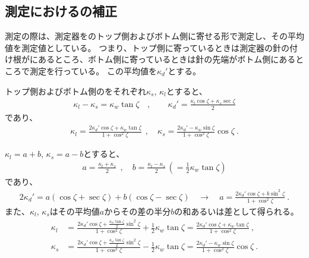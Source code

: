 \clearpage
\subsection{測定における\KeywayDepth の補正}%
測定の際は、測定器を\Keyway のトップ側およびボトム側に寄せる形で測定し、その平均値を測定値としている。
つまり、トップ側に寄っているときは測定器の針の付け根が\KeywayPos にあるところ、ボトム側に寄っているときは針の先端が\KeywayWidth ボトム側にあるところで測定を行っている。
この平均値を$\kappa_d'$とする。

トップ側およびボトム側の\AsideKeywayDepth をそれぞれ$\kappa_s$, $\kappa_l$とすると、
\begin{align*}
  \kappa_l-\kappa_s = \kappa_w\tan\zeta \quad,\qquad
  \kappa_d' = \frac{\kappa_l\cos\zeta+\kappa_s\sec\zeta}2
\end{align*}
であり、
\begin{align*}
  \kappa_l = \frac{2\kappa_d'\cos\zeta+\kappa_w\tan\zeta}{1+\cos^2\zeta}~~, \quad
  \kappa_s = \frac{2\kappa_d'-\kappa_w\sin\zeta}{1+\cos^2\zeta}\cos\zeta\ .
\end{align*}
\begin{hosoku}
$\kappa_l = a+b$, $\kappa_s = a-b$とすると、
\begin{align*}
  a = \frac{\kappa_l+\kappa_s}2~~, \quad
  b = \frac{\kappa_l-\kappa_s}2\,\left(= \frac12\kappa_w\tan\zeta\right)
\end{align*}
であり、
\begin{align*}
  2\kappa_d' = a(\cos\zeta+\sec\zeta)+b(\cos\zeta-\sec\zeta)
  \quad\longrightarrow\quad
  a = \frac{2\kappa_d'\cos\zeta+b\sin^2\zeta}{1+\cos^2\zeta}\ .
\end{align*}
また、$\kappa_l$, $\kappa_s$はその平均値$a$からその差の半分$b$の和あるいは差として得られる。
\begin{align*}
  \kappa_l
  &= \frac{2\kappa_d'\cos\zeta+\frac{\kappa_w\tan\zeta}2\sin^2\zeta}{1+\cos^2\zeta}+\frac12\kappa_w\tan\zeta
   = \frac{2\kappa_d'\cos\zeta+\kappa_w\tan\zeta}{1+\cos^2\zeta}\ ,\\
  \kappa_s
  &= \frac{2\kappa_d'\cos\zeta+\frac{\kappa_w\tan\zeta}2\sin^2\zeta}{1+\cos^2\zeta}-\frac12\kappa_w\tan\zeta
   = \frac{2\kappa_d'-\kappa_w\sin\zeta}{1+\cos^2\zeta}\cos\zeta\ .
\end{align*}
\end{hosoku}
